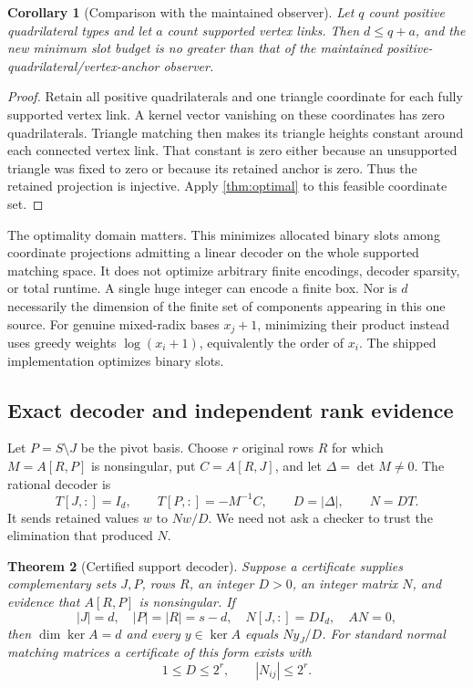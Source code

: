 \documentclass[11pt,a4paper]{article}
\newtheorem{theorem}{Theorem}[section]
\newtheorem{corollary}[theorem]{Corollary}
\theoremstyle{definition}
\begin{document}
\begin{corollary}[Comparison with the maintained observer]
\label{cor:oldobserver}
Let $q$ count positive quadrilateral types and let $a$ count supported vertex
links.  Then $d\le q+a$, and the new minimum slot budget is no greater than
that of the maintained positive-quadrilateral/vertex-anchor observer.
\end{corollary}
\begin{proof}
Retain all positive quadrilaterals and one triangle coordinate for each fully
supported vertex link.  A kernel vector vanishing on these coordinates has
zero quadrilaterals.  Triangle matching then makes its triangle heights
constant around each connected vertex link.  That constant is zero either
because an unsupported triangle was fixed to zero or because its retained
anchor is zero.  Thus the retained projection is injective.  Apply
\cref{thm:optimal} to this feasible coordinate set.
\end{proof}

The optimality domain matters.  This minimizes allocated binary slots among
coordinate projections admitting a linear decoder on the whole supported
matching space.  It does not optimize arbitrary finite encodings, decoder
sparsity, or total runtime.  A single huge integer can encode a finite box.
Nor is $d$ necessarily the dimension of the finite set of components appearing
in this one source.  For genuine mixed-radix bases $x_j+1$, minimizing their
product instead uses greedy weights $\log(x_i+1)$, equivalently the order of
$x_i$.  The shipped implementation optimizes binary slots.

\subsection{Exact decoder and independent rank evidence}

Let $P=S\setminus J$ be the pivot basis.  Choose $r$ original rows $R$ for which
$M=A[R,P]$ is nonsingular, put $C=A[R,J]$, and let $\Delta=\det M\ne0$.
The rational decoder is
\begin{equation}
 T[J,:]=I_d,\qquad T[P,:]=-M^{-1}C,\qquad
 D=|\Delta|,\qquad N=DT.                       \label{eq:decoder}
\end{equation}
It sends retained values $w$ to $Nw/D$.  We need not ask a checker to trust
the elimination that produced $N$.

\begin{theorem}[Certified support decoder]
\label{thm:decoder}
Suppose a certificate supplies complementary sets $J,P$, rows $R$, an integer
$D>0$, an integer matrix $N$, and evidence that $A[R,P]$ is nonsingular.  If
\[
 |J|=d,\quad |P|=|R|=s-d,\quad
 N[J,:]=D I_d,\quad AN=0,
\]
then $\dim\ker A=d$ and every $y\in\ker A$ equals $N y_J/D$.
For standard normal matching matrices a certificate of this form exists with
\[
 1\le D\le2^r,\qquad |N_{ij}|\le2^r.
\]
\end{theorem}
\end{document}
